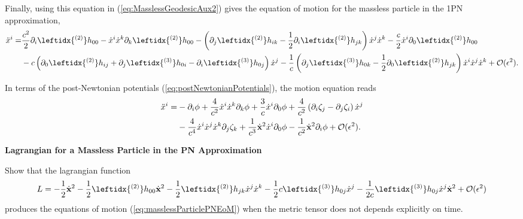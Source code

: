 Finally, using this equation in (\ref{eq:MasslessGeodesicAux2}) gives the equation of motion for the massless particle in the 1PN approximation,
\begin{align}
\ddot{x}^i = &\frac{c^2}{2} \partial_i \leftidx{^{(2)}} h_{00}  - \dot{x}^i \dot{x}^k \partial_k \leftidx{^{(2)}} h_{00} - \left( \partial_j \leftidx{^{(2)}} h_{ik} - \frac{1}{2} \partial_i \leftidx{^{(2)}} h_{jk} \right) \dot{x}^j \dot{x}^k - \frac{c}{2} \dot{x}^i \partial_0 \leftidx{^{(2)}} h_{00} \notag \\
& -c\left( \partial_0 \leftidx{^{(2)}} h_{ij} + \partial_j \leftidx{^{(3)}} h_{0i} - \partial_i \leftidx{^{(3)}} h_{0j}    \right) \dot{x}^j - \frac{1}{c} \left( \partial_j \leftidx{^{(3)}} h_{0k} -\frac{1}{2} \partial_0 \leftidx{^{(2)}} h_{jk}   \right) \dot{x}^i \dot{x}^j \dot{x}^k + \mathcal{O}(\epsilon^2) . \label{eq:masslessParticlePNEoM}
\end{align}

In terms of the post-Newtonian potentials (\ref{eq:postNewtonianPotentials}), the motion equation reads
\begin{align}
\ddot{x}^i = &-\partial_i \phi + \frac{4}{c^2} \dot{x}^i \dot{x}^k \partial_k \phi + \frac{3}{c} \dot{x}^i \partial_0 \phi + \frac{4}{c^2} \left( \partial_i \zeta_j - \partial_j \zeta_i \right) \dot{x}^j \notag \\
&- \frac{4}{c^4} \dot{x}^i \dot{x}^j \dot{x}^k \partial_j \zeta_k + \frac{1}{c^3} \dot{\textbf{x}}^2 \dot{x}^i \partial_0 \phi - \frac{1}{c^2} \dot{\textbf{x}}^2 \partial_i \phi +\mathcal{O}(\epsilon^2) .
\end{align}

\begin{exercise}
\textbf{Lagrangian for a Massless Particle in the PN Approximation}

Show that the lagrangian function
\begin{equation}
L = -\frac{1}{2} \dot{\textbf{x}}^2 - \frac{1}{2} \leftidx{^{(2)}} h_{00} \dot{\textbf{x}}^2 - \frac{1}{2} \leftidx{^{(2)}} h_{jk} \dot{x}^j \dot{x}^k - \frac{1}{2}c \leftidx{^{(3)}} h_{0j} \dot{x}^j - \frac{1}{2c} \leftidx{^{(3)}} h_{0j} \dot{x}^j\dot{\textbf{x}}^2 + \mathcal{O} (\epsilon^2)
\label{eq:MasslessParticlePNLagrangian}
\end{equation}
produces the equations of motion (\ref{eq:masslessParticlePNEoM}) when the metric tensor does not depends explicitly on time.
\end{exercise}






